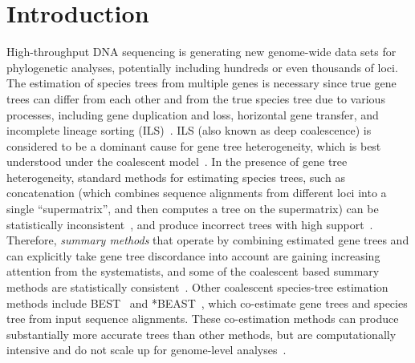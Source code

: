 \documentclass[10pt,a4paper]{article}
\providecommand{\keywords}[1]{\textbf{\textit{Keywords:}} #1}
\begin{document}
\begin{abstract}






\end{abstract}


\clearpage
{}

\section{Introduction}
High-throughput DNA sequencing is generating new genome-wide data sets for phylogenetic analyses, potentially including hundreds or even thousands of loci. The estimation of species trees from multiple genes is necessary since true gene trees can differ from each other and from the true species tree due to various processes, including gene duplication and loss, horizontal gene transfer, and incomplete lineage sorting (ILS)~\cite{M97}. ILS (also known as deep coalescence) is considered to be a dominant cause for gene tree heterogeneity, which is best understood under the coalescent model~\cite{DR06,DS05,Hud83,Nei86,Nei87,Rosenberg02,Tajima83,Takahata89}. In the presence of gene tree heterogeneity, standard methods for estimating species trees, such as concatenation (which combines sequence alignments from different loci into a single ``supermatrix'', and then computes a tree on the supermatrix) can be statistically inconsistent~\cite{roch2015likelihood,consensus-inconsistent}, and produce incorrect trees with high support~\cite{kubatko-degnan-2007}. Therefore, \textit{summary methods} that operate by combining estimated gene trees and can explicitly take gene tree discordance into account are gaining increasing attention from the systematists, and some of the coalescent based summary methods are statistically consistent~\cite{mpest,astral,larget-bioinf2010,glass,stem,svdquartet,steac,njst,astrid,stelar}. Other coalescent species-tree estimation methods include BEST~\cite{best} and *BEAST~\cite{heled-drummond}, which co-estimate gene trees and species tree from input sequence alignments.
These co-estimation methods can produce substantially more accurate trees than other methods, but are computationally intensive and do not  scale up for genome-level analyses~\cite{bayzid2013naive,smith2013target,bayzid-incomplete,leache-rannala}. 
\end{document}
